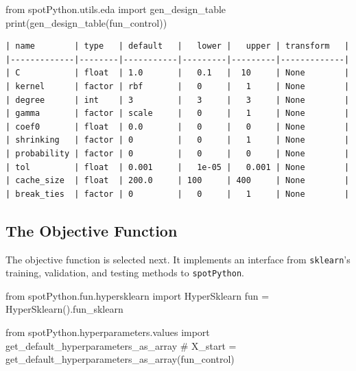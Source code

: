 \documentclass[
  letterpaper,
  DIV=11,
  numbers=noendperiod]{scrreprt}
\newenvironment{Shaded}{\begin{snugshade}}{\end{snugshade}}
\newcommand{\BuiltInTok}[1]{\textcolor[rgb]{0.00,0.23,0.31}{#1}}
\newcommand{\CommentTok}[1]{\textcolor[rgb]{0.37,0.37,0.37}{#1}}
\newcommand{\ImportTok}[1]{\textcolor[rgb]{0.00,0.46,0.62}{#1}}
\newcommand{\NormalTok}[1]{\textcolor[rgb]{0.00,0.23,0.31}{#1}}
\newcommand{\OperatorTok}[1]{\textcolor[rgb]{0.37,0.37,0.37}{#1}}
\begin{document}
\begin{Shaded}
\begin{Highlighting}[]
\ImportTok{from}\NormalTok{ spotPython.utils.eda }\ImportTok{import}\NormalTok{ gen\_design\_table}
\BuiltInTok{print}\NormalTok{(gen\_design\_table(fun\_control))}
\end{Highlighting}
\end{Shaded}

\begin{verbatim}
| name        | type   | default   |   lower |   upper | transform   |
|-------------|--------|-----------|---------|---------|-------------|
| C           | float  | 1.0       |   0.1   |  10     | None        |
| kernel      | factor | rbf       |   0     |   1     | None        |
| degree      | int    | 3         |   3     |   3     | None        |
| gamma       | factor | scale     |   0     |   1     | None        |
| coef0       | float  | 0.0       |   0     |   0     | None        |
| shrinking   | factor | 0         |   0     |   1     | None        |
| probability | factor | 0         |   0     |   0     | None        |
| tol         | float  | 0.001     |   1e-05 |   0.001 | None        |
| cache_size  | float  | 200.0     | 100     | 400     | None        |
| break_ties  | factor | 0         |   0     |   1     | None        |
\end{verbatim}

\hypertarget{sec-the-objective-function-10}{%
\subsection{The Objective
Function}\label{sec-the-objective-function-10}}

The objective function is selected next. It implements an interface from
\texttt{sklearn}'s training, validation, and testing methods to
\texttt{spotPython}.

\begin{Shaded}
\begin{Highlighting}[]
\ImportTok{from}\NormalTok{ spotPython.fun.hypersklearn }\ImportTok{import}\NormalTok{ HyperSklearn}
\NormalTok{fun }\OperatorTok{=}\NormalTok{ HyperSklearn().fun\_sklearn}
\end{Highlighting}
\end{Shaded}

\begin{Shaded}
\begin{Highlighting}[]
\ImportTok{from}\NormalTok{ spotPython.hyperparameters.values }\ImportTok{import}\NormalTok{ get\_default\_hyperparameters\_as\_array}
\CommentTok{\# X\_start = get\_default\_hyperparameters\_as\_array(fun\_control)}
\end{Highlighting}
\end{Shaded}
\end{document}
